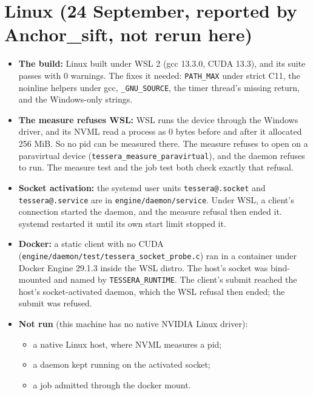 \section{\texorpdfstring{Linux (24 September, reported by Anchor\_\allowbreak{}sift, not rerun here)}{Linux (24 September, reported by Anchor\_sift, not rerun here)}}

\begin{itemize}
\item \textbf{The build:} Linux built under WSL 2 (gcc 13.3.0, CUDA 13.3), and its suite passes with 0 warnings. The fixes it needed: \texttt{PATH\_\allowbreak{}MAX} under strict C11, the noinline helpers under gcc, \texttt{\_\allowbreak{}GNU\_\allowbreak{}SOURCE}, the timer thread's missing return, and the Windows-only strings.
\item \textbf{The measure refuses WSL:} WSL runs the device through the Windows driver, and its NVML read a process as 0 bytes before and after it allocated 256 MiB. So no pid can be measured there. The measure refuses to open on a paravirtual device (\texttt{tessera\_\allowbreak{}measure\_\allowbreak{}paravirtual}), and the daemon refuses to run. The measure test and the job test both check exactly that refusal.
\item \textbf{Socket activation:} the systemd user units \texttt{tessera@.\allowbreak{}socket} and \texttt{tessera@.\allowbreak{}service} are in \texttt{engine/\allowbreak{}daemon/\allowbreak{}service}. Under WSL, a client's connection started the daemon, and the measure refusal then ended it. systemd restarted it until its own start limit stopped it.
\item \textbf{Docker:} a static client with no CUDA (\texttt{engine/\allowbreak{}daemon/\allowbreak{}test/\allowbreak{}tessera\_\allowbreak{}socket\_\allowbreak{}probe.\allowbreak{}c}) ran in a container under Docker Engine 29.1.3 inside the WSL distro. The host's socket was bind-mounted and named by \texttt{TESSERA\_\allowbreak{}RUNTIME}. The client's submit reached the host's socket-activated daemon, which the WSL refusal then ended; the submit was refused.
\item \textbf{Not run} (this machine has no native NVIDIA Linux driver):

\begin{itemize}
\item a native Linux host, where NVML measures a pid;
\item a daemon kept running on the activated socket;
\item a job admitted through the docker mount.
\end{itemize}
\end{itemize}
